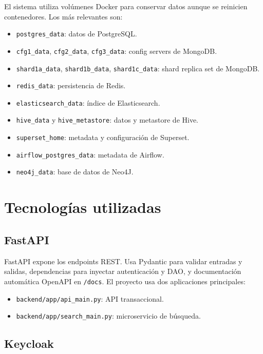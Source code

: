 \documentclass[12pt,letterpaper]{article}
\def\codefile#1{\nolinkurl{#1}}
\begin{document}
El sistema utiliza volúmenes Docker para conservar datos aunque se reinicien contenedores. Los más relevantes son:

\begin{itemize}
    \item \codefile{postgres\_data}: datos de PostgreSQL.
    \item \codefile{cfg1\_data}, \codefile{cfg2\_data}, \codefile{cfg3\_data}: config servers de MongoDB.
    \item \codefile{shard1a\_data}, \codefile{shard1b\_data}, \codefile{shard1c\_data}: shard replica set de MongoDB.
    \item \codefile{redis\_data}: persistencia de Redis.
    \item \codefile{elasticsearch\_data}: índice de Elasticsearch.
    \item \codefile{hive\_data} y \codefile{hive\_metastore}: datos y metastore de Hive.
    \item \codefile{superset\_home}: metadata y configuración de Superset.
    \item \codefile{airflow\_postgres\_data}: metadata de Airflow.
    \item \codefile{neo4j\_data}: base de datos de Neo4J.
\end{itemize}

\section{Tecnologías utilizadas}

\subsection{FastAPI}

FastAPI expone los endpoints REST. Usa Pydantic para validar entradas y salidas, dependencias para inyectar autenticación y DAO, y documentación automática OpenAPI en \codefile{/docs}. El proyecto usa dos aplicaciones principales:

\begin{itemize}
    \item \codefile{backend/app/api\_main.py}: API transaccional.
    \item \codefile{backend/app/search\_main.py}: microservicio de búsqueda.
\end{itemize}

\subsection{Keycloak}
\end{document}
